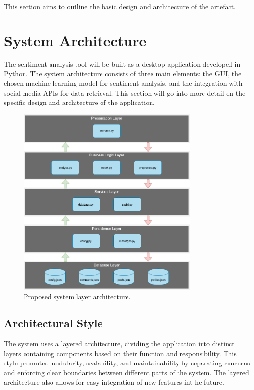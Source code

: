 This section aims to outline the basic design and architecture of the artefact.

\section{System Architecture}
The sentiment analysis tool will be built as a desktop application developed in Python. The system architecture consists of three main elements: the GUI, the chosen machine-learning model for sentiment analysis, and the integration with social media APIs for data retrieval. This section will go into more detail on the specific design and architecture of the application.

\begin{figure}[h]
    \centering
    \includegraphics[width=0.8\textwidth]{figures/system-architecture-layers.png}
    \caption{Proposed system layer architecture.}
\end{figure}

    \subsection{Architectural Style}
    The system uses a layered architecture, dividing the application into distinct layers containing components based on their function and responsibility. This style promotes modularity, scalability, and maintainability by separating concerns and enforcing clear boundaries between different parts of the system. The layered architecture also allows for easy integration of new features int he future.

